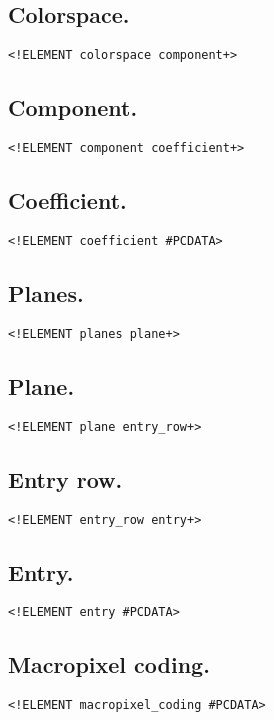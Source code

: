 \subsection{Colorspace.}
\begin{verbatim}
<!ELEMENT colorspace component+>
\end{verbatim}

\subsection{Component.}
\begin{verbatim}
<!ELEMENT component coefficient+>
\end{verbatim}

\subsection{Coefficient.}
\begin{verbatim}
<!ELEMENT coefficient #PCDATA>
\end{verbatim}

\subsection{Planes.}
\begin{verbatim}
<!ELEMENT planes plane+>
\end{verbatim}

\subsection{Plane.}
\begin{verbatim}
<!ELEMENT plane entry_row+>
\end{verbatim}

\subsection{Entry row.}
\begin{verbatim}
<!ELEMENT entry_row entry+>
\end{verbatim}

\subsection{Entry.}
\begin{verbatim}
<!ELEMENT entry #PCDATA>
\end{verbatim}

\subsection{Macropixel coding.}
\begin{verbatim}
<!ELEMENT macropixel_coding #PCDATA>
\end{verbatim}

